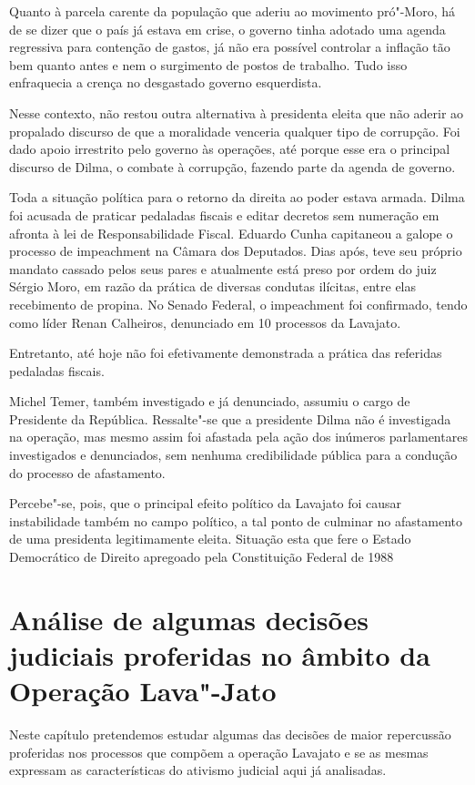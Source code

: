 Quanto à parcela carente da população que aderiu ao movimento pró"-Moro,
há de se dizer que o país já estava em crise, o governo tinha adotado
uma agenda regressiva para contenção de gastos, já não era possível
controlar a inflação tão bem quanto antes e nem o surgimento de postos
de trabalho. Tudo isso enfraquecia a crença no desgastado governo
esquerdista.

Nesse contexto, não restou outra alternativa à presidenta eleita que não
aderir ao propalado discurso de que a moralidade venceria qualquer tipo
de corrupção. Foi dado apoio irrestrito pelo governo às operações, até
porque esse era o principal discurso de Dilma, o combate à corrupção,
fazendo parte da agenda de governo.

Toda a situação política para o retorno da direita ao poder estava
armada. Dilma foi acusada de praticar pedaladas fiscais e editar
decretos sem numeração em afronta à lei de Responsabilidade Fiscal.
Eduardo Cunha capitaneou a galope o processo de impeachment na Câmara
dos Deputados. Dias após, teve seu próprio mandato cassado pelos seus
pares e atualmente está preso por ordem do juiz Sérgio Moro, em razão da
prática de diversas condutas ilícitas, entre elas recebimento de
propina. No Senado Federal, o impeachment foi confirmado, tendo como
líder Renan Calheiros, denunciado em 10 processos da Lavajato.

Entretanto, até hoje não foi efetivamente demonstrada a prática das
referidas pedaladas fiscais.

Michel Temer, também investigado e já denunciado, assumiu o cargo de
Presidente da República. Ressalte"-se que a presidente Dilma não é
investigada na operação, mas mesmo assim foi afastada pela ação dos
inúmeros parlamentares investigados e denunciados, sem nenhuma
credibilidade pública para a condução do processo de afastamento.

Percebe"-se, pois, que o principal efeito político da Lavajato foi causar
instabilidade também no campo político, a tal ponto de culminar no
afastamento de uma presidenta legitimamente eleita. Situação esta que
fere o Estado Democrático de Direito apregoado pela Constituição Federal
de 1988

\section{Análise de algumas decisões judiciais proferidas
no âmbito da Operação Lava"-Jato}

Neste capítulo pretendemos estudar algumas das decisões de maior
repercussão proferidas nos processos que compõem a operação Lavajato e
se as mesmas expressam as características do ativismo judicial aqui já
analisadas.

